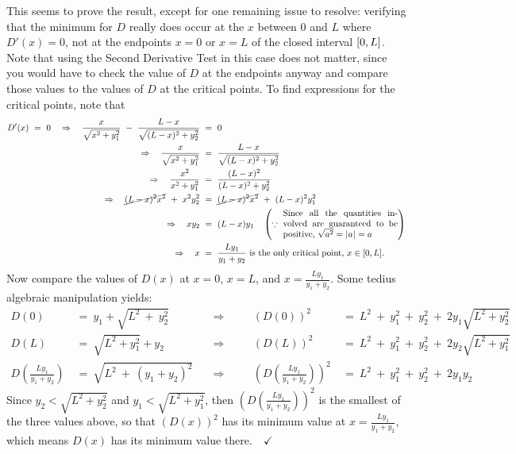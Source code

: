 \begin{exmp}
This seems to prove the result, except for one remaining issue to resolve:
verifying that the minimum for $D$ really does occur at the $x$ between $0$ and
$L$ where $D'(x)=0$, not at the endpoints $x=0$ or $x=L$ of the closed interval
$\lbrack 0,L \rbrack$. Note that using the Second Derivative Test in this case does not
matter, since you would have to check the value of $D$ at the endpoints anyway
and compare those values to the values of $D$ at the critical points. To find
expressions for the critical points, note that
\begin{align*}
D'(x) ~=~ 0 \quad\Rightarrow\quad \frac{x}{\sqrt{x^2 + y_1^2}} ~-~ \frac{L-x}{\sqrt{(L-x)^2 + y_2^2}} ~&=~ 0\\
\Rightarrow\quad \frac{x}{\sqrt{x^2 + y_1^2}} ~&=~ \frac{L-x}{\sqrt{(L-x)^2 + y_2^2}}\\
\Rightarrow\quad \frac{x^2}{x^2 + y_1^2} ~&=~ \frac{(L-x)^2}{(L-x)^2 + y_2^2}\\
\Rightarrow\quad \cancel{(L-x)^2 x^2} ~+~ x^2 y_2^2 ~&=~ \cancel{(L-x)^2 x^2} ~+~ (L-x)^2 y_1^2\\
\Rightarrow\quad xy_2 ~&=~ (L-x)y_1 \quad\left(\because~\begin{minipage}{0.38\linewidth}Since all the quantities involved are guaranteed to be positive, $\sqrt{a^2}=\abs{a}=a$\end{minipage}\right)\\
\Rightarrow\quad x ~&=~ \frac{Ly_1}{y_1 + y_2} ~\text{is the only critical point,}~x \in \ival{0}{L}.
\end{align*}
Now compare the values of $D(x)$ at $x=0$, $x=L$, and
$x=\frac{Ly_1}{y_1 + y_2}$. Some tedius algebraic manipulation yields:
\begin{align*}
D(0) ~&=~ y_1 + \sqrt{L^2 ~+~ y_2^2} &\quad\Rightarrow\quad& &\left(D(0)\right)^2 ~&=~ L^2 ~+~ y_1^2 ~+~ y_2^2 ~+~ 2y_1\sqrt{L^2 + y_2^2}\\
D(L) ~&=~ \sqrt{L^2 + y_1^2} + y_2 &\quad\Rightarrow\quad& &\left(D(L)\right)^2 ~&=~ L^2 ~+~ y_1^2 ~+~ y_2^2 ~+~ 2y_2\sqrt{L^2 + y_1^2}\\
D\left(\tfrac{Ly_1}{y_1 + y_2}\right) ~&=~ \sqrt{L^2 ~+~ (y_1 + y_2)^2} &\quad\Rightarrow\quad& &\left(D\left(\tfrac{Ly_1}{y_1 + y_2}\right)\right)^2 ~&=~ L^2 ~+~ y_1^2 ~+~ y_2^2 ~+~ 2y_1y_2
\end{align*}
Since $y_2 < \sqrt{L^2 + y_2^2}$ and $y_1 < \sqrt{L^2 + y_1^2}$, then
$\left(D\left(\tfrac{Ly_1}{y_1 + y_2}\right)\right)^2$ is the smallest of the three values
above, so that $\left(D(x)\right)^2$ has its minimum value at $x=\frac{Ly_1}{y_1 + y_2}$,
which means $D(x)$ has its minimum value there.$\quad\checkmark$
\end{exmp}
